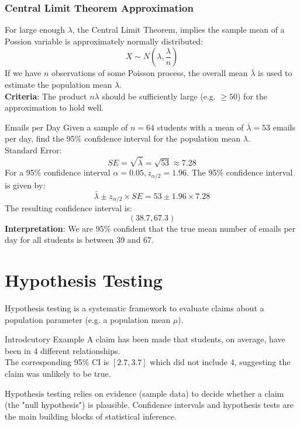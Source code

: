 \documentclass[9pt]{extarticle}
\begin{document}
\subsubsection{Central Limit Theorem Approximation}
For large enough $\lambda$, the Central Limit Theorem, implies the sample mean of a Possion variable is approximately normally distributed:
$$X \sim N(\lambda, \frac{\lambda}{n})$$
If we have $n$ observations of some Poisson process, the overall mean $\bar{\lambda}$ is used to estimate the population mean $\lambda$. \\[2ex]
\textbf{Criteria}: The product $n\lambda$ should be sufficiently large (e.g. $\geq 50$) for the approximation to hold well.
\begin{examplebox}{Emails per Day}{}
    Given a sample of $n=64$ students with a mean of $\bar{\lambda} = 53$ emails per day, find the 95\% confidence interval for the population mean $\lambda$.\\[2ex]

    Standard Error: 
    $$SE = \sqrt{\bar{\lambda}} = \sqrt{53} \approx 7.28$$
    For a 95\% confidence interval $\alpha = 0.05, z_{\alpha/2} = 1.96$.
    The 95\% confidence interval is given by:
    $$\bar{\lambda} \pm z_{\alpha/2} \times SE = 53 \pm 1.96 \times 7.28$$
    The resulting confidence interval is:
    $$(38.7, 67.3)$$
    \textbf{Interpretation}: We are 95\% confident that the true mean number of emails per day for all students is between 39 and 67.
    
\end{examplebox}

\pagebreak
\section{Hypothesis Testing}
Hypothesis testing is a systematic framework to evaluate claims about a population parameter (e.g. a population mean $\mu$).
\begin{examplebox}{Introdcutory Example}{}
    A claim has been made that students, on average, have been in 4 different relationships. \\
    The corresponding 95\% CI is $[2.7, 3.7]$ which did not include 4, suggesting the claim was unlikely to be true.
\end{examplebox}
Hypothesis testing relies on evidence (sample data) to decide whether a claim (the "null hypothesis") is plausible. Confidence intervals and hypothesis tests are the main building blocks of statistical inference.
\end{document}
